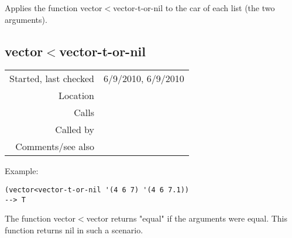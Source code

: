 \noindent Applies the function
vector$<$vector-t-or-nil to the car of each list (the
two arguments).


\subsection*{vector$<$vector-t-or-nil}\label{fun:vector<vector-t-or-nil}

\vspace{0.3cm}
\begin{tabular}{r|p{8cm}}
Started, last checked & 6/9/2010, 6/9/2010 \\
Location & \nameref{sec:structural-induction-merge} \\
Calls & \\
Called by &\nameref{fun:vector<vector-car} \\
Comments/see also & \nameref{fun:vector<vector}
\end{tabular}

\vspace{0.5cm}
\noindent Example:
\begin{verbatim}
(vector<vector-t-or-nil '(4 6 7) '(4 6 7.1))
--> T
\end{verbatim}

\noindent The function vector$<$vector returns "equal"
if the arguments were equal. This function returns nil
in such a scenario.
















